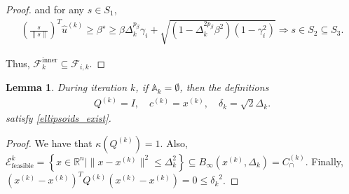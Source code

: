 \documentclass{article}
\newtheorem{lemma}[theorem]{Lemma}
\theoremstyle{case}
\newcommand{\activeconstraintsk}{{\mathbb A_{k}}}
\newcommand{\bs}{{\beta^{\star}}}
\newcommand{\capcones}{{C^{(k)}_{\cap}}}
\newcommand{\ck}{{c^{(k)}}}
\newcommand{\dk}{\Delta_k}
\newcommand{\fcki}{{\mathcal {F}^{\text{inner}}_k}}
\newcommand{\fik}{{\mathcal F_{i, k}}}
\newcommand{\huk}{{{\hat u}^{(k)}}}
\newcommand{\qk}{{Q^{(k)}}}
\newcommand{\Rn}{\mathbb R^n}
\newcommand{\sdk}{{\delta_k}}
\newcommand{\tr}{{ B_{\infty}\left(\xk, \dk\right) }}
\newcommand{\unshiftedellipsoid}{{\mathcal E^k_{\text{feasible}}}}
\newcommand{\xk}{{x^{(k)}}}
\begin{document}
\begin{proof}
and for any $s\in S_1$,
\begin{align*}
\left(\frac{s}{\|s\|}\right)^T\huk \ge \bs 
\ge \beta\dk^{p_{\beta}}\gamma_i + \sqrt{(1 - \dk^{2p_{\beta}}\beta^2)\left(1 - \gamma_i^2\right)}
\Longrightarrow s \in S_2 \subseteq S_3.
\end{align*}

Thus, $\fcki \subseteq \fik$.
\end{proof}



\begin{lemma}
\label{ellsoid_is_suitable_theorem_p1}
During iteration $k$, if $\activeconstraintsk = \emptyset$, then the definitions
\begin{align*}
\qk = I, \quad \ck = \xk, \quad \sdk = \sqrt{2} \dk.
\end{align*}
satisfy \cref{ellipsoids_exist}.
\end{lemma}
\begin{proof}
We have that $\kappa(\qk) = 1$.
Also, $\unshiftedellipsoid = \left\{x \in \Rn | \|x - \xk\|^2 \le \dk^2 \right\} \subseteq \tr = \capcones$.
Finally, $(\xk - \xk)^T\qk(\xk - \xk) = 0 \le \sdk^2$.
\end{proof}
\end{document}
